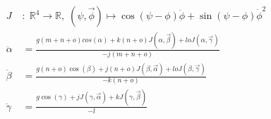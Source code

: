 
\begin{align*}
J \; &: \; \mathbb{R}^4 \rightarrow \mathbb{R} , \; (\psi, \vec{\phi}) \mapsto \cos(\psi - \phi) \ddot{\phi} + \sin(\psi - \phi) \dot{\phi}^2
\\
\ddot{\alpha} &= \frac{g (m+n+o) cos(\alpha) + k (n+o) J(\alpha, \vec{\beta}) + l o J(\alpha, \vec{\gamma})}{-j(m+n+o)}
\\
\ddot{\beta} &= \frac{g (n+o) \cos(\beta) + j (n+o) J(\beta, \vec{\alpha}) + l o J(\beta, \vec{\gamma})}{-k (n+o)}
\\
\ddot{\gamma} &= \frac{g \cos(\gamma) + j J(\gamma, \vec{\alpha}) + k J(\gamma, \vec{\beta})}{-l}
\end{align*}
